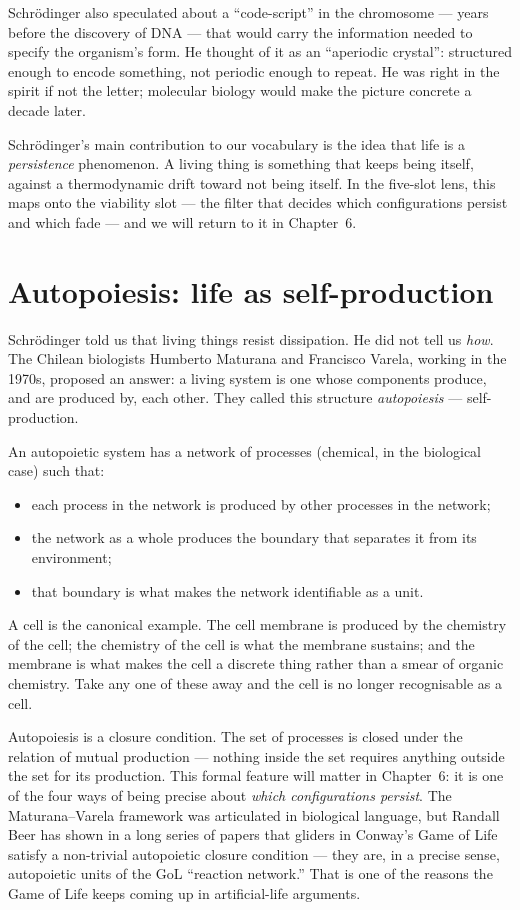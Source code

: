Schr\"odinger also speculated about a ``code-script'' in the chromosome ---
years before the discovery of DNA --- that would carry the information
needed to specify the organism's form. He thought of it as an
``aperiodic crystal'': structured enough to encode something, not periodic
enough to repeat. He was right in the spirit if not the letter; molecular
biology would make the picture concrete a decade later.

Schr\"odinger's main contribution to our vocabulary is the idea that life
is a \emph{persistence} phenomenon. A living thing is something that
keeps being itself, against a thermodynamic drift toward not being
itself. In the five-slot lens, this maps onto the viability slot --- the
filter that decides which configurations persist and which fade --- and
we will return to it in Chapter~6.

\section{Autopoiesis: life as self-production}

Schr\"odinger told us that living things resist dissipation. He did not
tell us \emph{how}. The Chilean biologists Humberto Maturana and Francisco
Varela, working in the 1970s, proposed an answer: a living system is one
whose components produce, and are produced by, each other. They called
this structure \emph{autopoiesis} --- self-production.

An autopoietic system has a network of processes (chemical, in the
biological case) such that:
\begin{itemize}[leftmargin=1.5em,itemsep=2pt]
  \item each process in the network is produced by other processes in the
    network;
  \item the network as a whole produces the boundary that separates it
    from its environment;
  \item that boundary is what makes the network identifiable as a unit.
\end{itemize}

A cell is the canonical example. The cell membrane is produced by the
chemistry of the cell; the chemistry of the cell is what the membrane
sustains; and the membrane is what makes the cell a discrete thing rather
than a smear of organic chemistry. Take any one of these away and the
cell is no longer recognisable as a cell.

Autopoiesis is a closure condition. The set of processes is closed under
the relation of mutual production --- nothing inside the set requires
anything outside the set for its production. This formal feature will
matter in Chapter~6: it is one of the four ways of being precise about
\emph{which configurations persist}. The Maturana--Varela framework was
articulated in biological language, but Randall Beer has shown in a long
series of papers that gliders in Conway's Game of Life satisfy a
non-trivial autopoietic closure condition --- they are, in a precise
sense, autopoietic units of the GoL ``reaction network.'' That is one of
the reasons the Game of Life keeps coming up in artificial-life
arguments.

